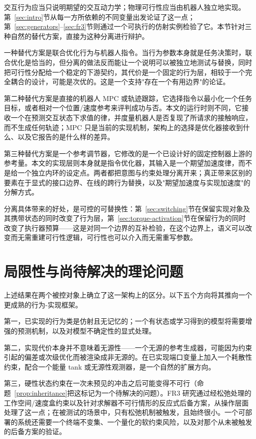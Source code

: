 \documentclass[journal]{IEEEtran}
\begin{document}
交互行为应当只说明期望的交互动力学；物理可行性应当由机器人独立地实现。第~\ref{sec:intro}节从每一方所依赖的不同变量出发论证了这一点；第~\ref{sec:generators}--\ref{sec:fr3}节则通过一个可执行的仿射实例检验了它。本节针对三种自然的替代方案，直接为这种分离进行辩护。

一种替代方案是联合优化行为与机器人指令。当行为参数本身就是任务决策时，联合优化是恰当的，但分离的做法反而能让一个说明可以被独立地测试与替换，同时把可行性分配给一个稳定的下游契约，其代价是一个固定的行为层，相较于一个完全耦合的设计，可能是次优的。这是一个支持"存在一个有用边界"的论证。

第二种替代方案是直接的机器人 MPC 或轨迹跟踪，它选择指令以最小化一个任务目标，或者相对一个位置/速度参考来评判成功与否。本文的运行时则不同，它接收一个在预测交互状态下求值的律，并度量机器人是否复现了所请求的接触响应，而不生成任何轨迹；MPC 只是当前的实现机制，架构上的选择是优化器接收到什么、以及它报告的是什么样的差异。

第三种替代方案是一个参考调节器，它修改的是一个已设计好的固定控制器上游的参考量。本文的实现层则本身就是指令优化器，其输入是一个期望加速度律，而不是给一个独立内环的设定点。两者都把意图与约束处理分离开来；真正带来区别的要素在于显式的接口边界、在线的跨行为替换，以及"期望加速度与实现加速度"的分解方式。

分离具体带来的好处，是可控的可替换性：第~\ref{sec:switching}节在保留实现对象及其携带状态的同时改变了行为层，第~\ref{sec:torque-activation}节在保留行为的同时改变了执行器预算——这是对同一个边界的互补检验，在这个边界上，语义可以改变而无需重建可行性逻辑，可行性也可以介入而无需重写参数。

\section{局限性与尚待解决的理论问题}
\label{sec:limitations}

上述结果在两个被控对象上确立了这一架构上的区分。以下五个方向将其推向一个更成熟的行为-实现框架。

第一，已实现的行为类是仿射且无记忆的；一个有状态或学习得到的模型将需要增强的预测机制，以及对模型不确定性的显式处理。

第二，实现代价本身并不意味着无源性——一个无源的参考生成器，可能因为约束引起的偏差或次级优化而被渲染成非无源的。在已实现端口变量上加入一个耗散性约束，配合一个能量 tank 或无源性观测器，是一个自然的扩展方向。

第三，硬性状态约束在一次未预见的冲击之后可能变得不可行（命题~\ref{prop:inheritance}把这标记为一个待解决的问题）。FR3 研究通过经松弛处理的工作空间/速度盒约束以及针对求解器不可行情形的反应式后备方案，从操作层面处理了这一点；在被测试的场景中，只有松弛机制被触发，且始终很小。一个可部署的系统还需要一个终端不变集、一个量化的软约束风险，以及对那个从未被触发的后备方案的验证。
\end{document}
